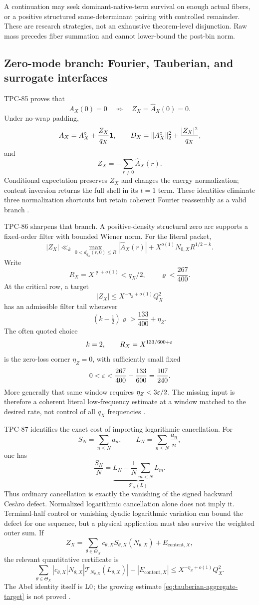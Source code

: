 A continuation may seek dominant-native-term survival on enough
actual fibers, or a positive structured same-determinant pairing
with controlled remainder.  These are research strategies, not an
exhaustive theorem-level disjunction.  Raw mass precedes fiber
summation and cannot lower-bound the post-bin norm.

\subsection{Zero-mode branch: Fourier, Tauberian, and surrogate
interfaces}

TPC-85 proves that
\[
 A_X(0)=0
\quad\not\Longrightarrow\quad
 Z_X=\widehat A_X(0)=0.
\]
Under no-wrap padding,
\[
 A_X=A_X^\circ+\frac{Z_X}{q_X}\mathbf 1,\qquad
 D_X=\|A_X^\circ\|_2^2+\frac{|Z_X|^2}{q_X},
\]
and
\[
 Z_X=-\sum_{r\ne0}\widehat A_X(r).
\]
Conditional expectation preserves \(Z_X\) and changes the energy
normalization; content inversion returns the full shell in its
\(t=1\) term.  These identities eliminate three normalization
shortcuts but retain coherent Fourier reassembly as a valid branch
\citep{WangTPC85}.

TPC-86 sharpens that branch.  A positive-density structural zero arc
supports a fixed-order filter with bounded Wiener norm.  For the
literal packet,
\[
 |Z_X|
 \ll_k
 \max_{0<d_{q_X}(r,0)\le R}
 |\widehat A_X(r)|
 +
 X^{o(1)}N_{0,X}R^{1/2-k}.
\]
Write
\[
 R_X=X^{\varrho+o(1)}<q_X/2,\qquad
 \varrho<\frac{267}{400}.
\]
At the critical row, a target
\[
 |Z_X|\le X^{-\eta_Z+o(1)}Q_X^2
\]
has an admissible filter tail whenever
\[
 (k-\tfrac12)\varrho>\frac{133}{400}+\eta_Z.
\]
The often quoted choice
\[
 k=2,\qquad R_X=X^{133/600+\varepsilon}
\]
is the zero-loss corner \(\eta_Z=0\), with sufficiently small fixed
\[
 0<\varepsilon<\frac{267}{400}-\frac{133}{600}
 =\frac{107}{240}.
\]
More generally that same window requires
\(\eta_Z<3\varepsilon/2\).  The missing input is therefore
a coherent literal low-frequency estimate at a window matched to
the desired rate, not control of all \(q_X\) frequencies
\citep{WangTPC86}.

TPC-87 identifies the exact cost of importing logarithmic
cancellation.  For
\[
 S_N=\sum_{n\le N}a_n,\qquad
 L_N=\sum_{n\le N}\frac{a_n}{n},
\]
one has
\[
 \frac{S_N}{N}
 =
 \underbrace{L_N-\frac1N\sum_{m<N}L_m}_{\mathcal T_N(L)}.
\]
Thus ordinary cancellation is exactly the vanishing of the signed
backward Ces\`aro defect.  Normalized logarithmic cancellation alone
does not imply it.  Terminal-half control or vanishing dyadic
logarithmic variation can bound the defect for one sequence, but a
physical application must also survive the weighted outer sum.  If
\[
 Z_X=\sum_{\theta\in\Theta_X}
 c_{\theta,X}S_{\theta,X}(N_{\theta,X})
 +E_{\mathrm{content},X},
\]
the relevant quantitative certificate is
\begin{equation}
 \sum_{\theta\in\Theta_X}|c_{\theta,X}|N_{\theta,X}
 \left|\mathcal T_{N_{\theta,X}}(L_{\theta,X})\right|
 +|E_{\mathrm{content},X}|
 \le X^{-\eta_Z+o(1)}Q_X^2.
\label{eq:tauberian-aggregate-target}
\end{equation}
The Abel identity itself is \(\mathrm{L0}\); the growing estimate
\eqref{eq:tauberian-aggregate-target} is not proved
\citep{WangTPC87}.

